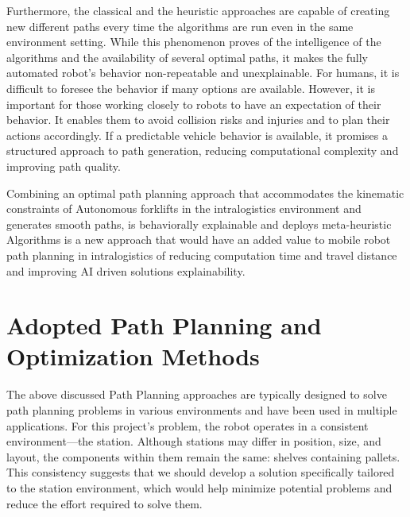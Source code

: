 Furthermore, the classical and the heuristic approaches are capable of creating new different paths every time the 
algorithms are run even in the same environment setting. While this phenomenon proves of the intelligence of the algorithms
and the availability of several optimal paths, it makes the fully automated robot's behavior non-repeatable and unexplainable. 
For humans, it is difficult to foresee the behavior if many options are available. However, it is important for those working 
closely to robots to have an expectation of their behavior. It enables them to avoid collision risks and injuries and to 
plan their actions accordingly. If a predictable vehicle behavior is available, it promises a structured approach to path 
generation, reducing computational complexity and improving path quality.

Combining an optimal path planning approach that accommodates the kinematic constraints of Autonomous forklifts in the
intralogistics environment and generates smooth paths, is behaviorally explainable and deploys meta-heuristic 
Algorithms is a new approach that would have an added value to mobile robot path planning in intralogistics of 
reducing computation time and travel distance and improving AI driven solutions explainability. 

\section{Adopted Path Planning and Optimization Methods}

The above discussed Path Planning approaches are typically
designed to solve path planning problems in various environments and have been used in multiple
applications.
For this project's problem, the robot operates in a consistent environment—the station. 
Although stations may differ in 
position, size, and layout, the components within them remain the same: shelves containing pallets. 
This consistency suggests that we should 
develop a solution specifically tailored to the station environment, which would help minimize potential problems 
and reduce the effort required to solve them. 

